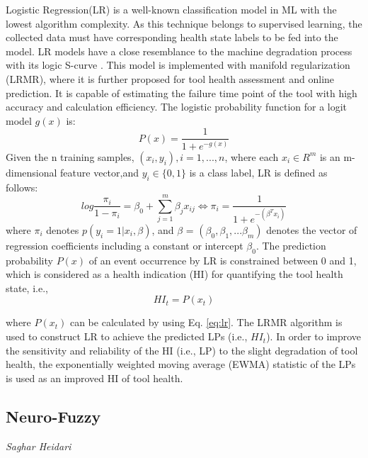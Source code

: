 Logistic Regression(LR) is a well-known classification model in ML with the lowest algorithm complexity. As this technique belongs to supervised learning, the collected data must have corresponding health state labels to be fed into the model. LR models have a close resemblance to the machine degradation process with its logic S-curve \cite{CAESARENDRA20101161}. This model is implemented with manifold regularization (LRMR), where it is further proposed for tool health assessment and online prediction\cite{DBLP:journals/asc/Yu18}. It is capable of estimating the failure time point of the tool with high accuracy and calculation efficiency. The logistic probability function for a logit model $g(x)$ is:
\begin{equation}
    P(x) = \frac{1}{1 + e^{-g(x)}}
\label{eq:lr}
\end{equation}
Given the n training samples, ${(x_i, y_i),
i = 1, ..., n}$, where each $x_i \in R^m$ is an m-dimensional feature vector,and $y_i \in \{0, 1\}$ is a class label, LR is defined as follows:
\begin{equation}
    log \frac{\pi_i}{1-\pi_i} = \beta_0 + \sum_{j=1}^m \beta_j x_{ij} \Leftrightarrow \pi_i = \frac{1}{1 + e^{-(\beta^T x_i)}}
\end{equation}
where $\pi_i$ denotes $p(y_i = 1|x_i,\beta)$, and $\beta$ = $(\beta_0, \beta_1, ...\beta_m)$ denotes the
vector of regression coefficients including a constant or intercept $\beta_0$. The prediction probability $P(x)$ of an event occurrence by LR is constrained between 0 and 1, which is considered as a health indication (HI) for quantifying the tool health state, i.e.,
\begin{equation}
HI_t = P(x_t)    
\end{equation}

where $P(x_t)$ can be calculated by using Eq. \ref{eq:lr}. The LRMR algorithm is used to construct LR to achieve the predicted LPs (i.e., $HI_t$). In order to improve the sensitivity and reliability of the HI (i.e., LP) to the slight degradation of tool health, the exponentially weighted moving average (EWMA) statistic of the LPs is used as an improved HI of tool health.

\subsection{Neuro-Fuzzy}
\vspace*{-15mm}
\hfill{\normalsize\emph{Saghar Heidari}}

